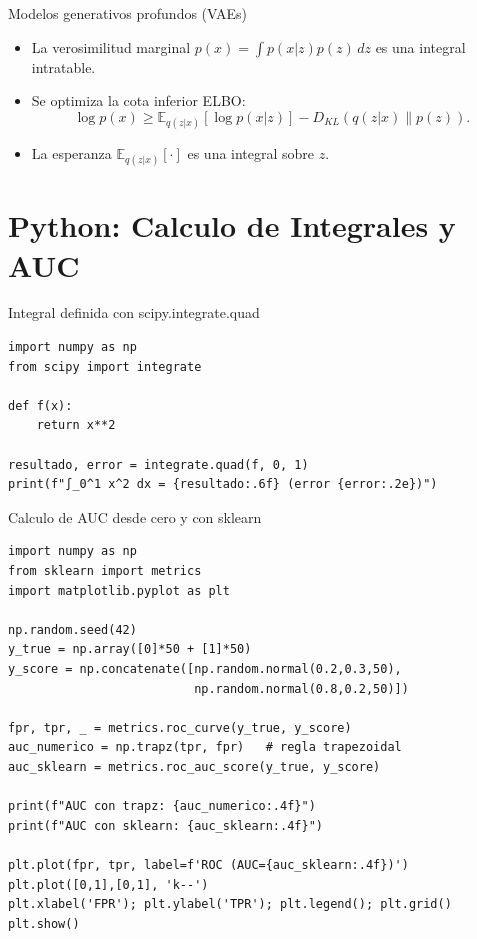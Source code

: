 \documentclass[aspectratio=169, 10pt, xcolor=table]{beamer}
\begin{document}
\begin{frame}{Modelos generativos profundos (VAEs)}
    \begin{itemize}
        \item La verosimilitud marginal $p(x)=\int p(x|z)p(z)\,dz$ es una integral intratable.
        \item Se optimiza la cota inferior ELBO:
        \[
        \log p(x) \ge \mathbb{E}_{q(z|x)}[\log p(x|z)] - D_{KL}(q(z|x)\|p(z)).
        \]
        \item La esperanza $\mathbb{E}_{q(z|x)}[\cdot]$ es una integral sobre $z$.
    \end{itemize}
\end{frame}

\section{Python: Calculo de Integrales y AUC}

\begin{frame}[fragile]{Integral definida con scipy.integrate.quad}
    \begin{lstlisting}
import numpy as np
from scipy import integrate

def f(x):
    return x**2

resultado, error = integrate.quad(f, 0, 1)
print(f"∫_0^1 x^2 dx = {resultado:.6f} (error {error:.2e})")
    \end{lstlisting}
\end{frame}

\begin{frame}[fragile]{Calculo de AUC desde cero y con sklearn}
    \begin{lstlisting}
import numpy as np
from sklearn import metrics
import matplotlib.pyplot as plt

np.random.seed(42)
y_true = np.array([0]*50 + [1]*50)
y_score = np.concatenate([np.random.normal(0.2,0.3,50),
                          np.random.normal(0.8,0.2,50)])

fpr, tpr, _ = metrics.roc_curve(y_true, y_score)
auc_numerico = np.trapz(tpr, fpr)   # regla trapezoidal
auc_sklearn = metrics.roc_auc_score(y_true, y_score)

print(f"AUC con trapz: {auc_numerico:.4f}")
print(f"AUC con sklearn: {auc_sklearn:.4f}")

plt.plot(fpr, tpr, label=f'ROC (AUC={auc_sklearn:.4f})')
plt.plot([0,1],[0,1], 'k--')
plt.xlabel('FPR'); plt.ylabel('TPR'); plt.legend(); plt.grid()
plt.show()
    \end{lstlisting}
\end{frame}
\end{document}
